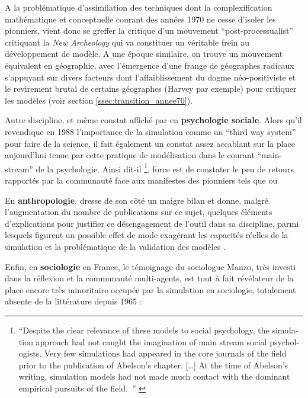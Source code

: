 A la problématique d'assimilation des techniques dont la complexification mathématique et conceptuelle courant des années 1970 ne cesse d'isoler les pionniers, vient donc se greffer la critique d'un mouvement \foreignquote{english}{post-processualist} critiquant la \textit{New Archeology} qui va constituer un véritable frein au développement de modèle. A une époque similaire, on trouve un mouvement équivalent en géographie, avec l'émergence d'une frange de géographes radicaux s'appuyant sur divers facteurs dont l'affaiblissement du dogme néo-positiviste et le revirement brutal de certains géographes (Harvey par exemple) pour critiquer les modèles (voir section \ref{ssec:transition_annee70}).

Autre discipline, et même constat affiché par \textcite{Ostrom1988} en \textbf{psychologie sociale}. Alors qu'il revendique en 1988 l'importance de la simulation comme un \foreignquote{english}{third way system} pour faire de la science, il fait également un constat assez accablant sur la place aujourd'hui tenue par cette pratique de modélisation dans le courant \foreignquote{english}{mainstream} de la psychologie. Ainsi dit-il \footnote{ \foreignquote{english}{Despite the clear relevance of these models to  social psychology, the simulation approach had not caught the imagination of main stream social psychologists. Very few simulations had appeared in the core journals of the field prior to the publication of Abelson's chapter. […] At the time of Abelson's writing, simulation models had not made much contact with the dominant empirical pursuits of the field. } \autocite[382]{Ostrom1988}}, force est de constater le peu de retours rapportés par la communauté face aux manifestes des pionniers tels que \textcite{Gullahorn1965} ou \textcite{Abelson1968}

En \textbf{anthropologie}, \textcite{Dyke1981} dresse de son côté un maigre bilan et donne, malgré l'augmentation du nombre de publications sur ce sujet, quelques éléments d'explications pour justifier ce désengagement de l'outil dans sa discipline, parmi lesquels figurent un possible effet de mode exagérant les capacités réelles de la simulation et la problématique de la validation des modèles . 

Enfin, en \textbf{sociologie} en France, le témoignage du sociologue Manzo, très investi dans la réflexion et la communauté multi-agents, est tout à fait révélateur de la place encore très minoritaire occupée par la simulation en sociologie, totalement absente de la littérature depuis 1965 :

